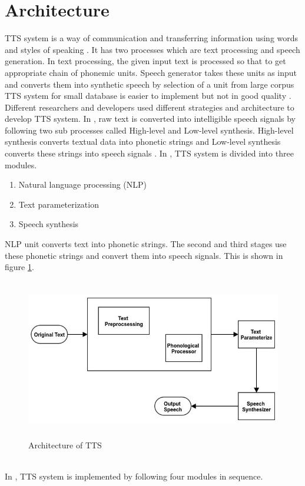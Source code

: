 \section{Architecture}
TTS system is a way of communication and transferring information using words and styles of speaking \cite{eide2004corpus}. It has two processes which are text processing and speech generation. In text processing, the given input text is processed so that to get appropriate chain of phonemic units. Speech generator takes these units as input and converts them into synthetic speech by selection of a unit from large corpus TTS system for small database is easier to implement but not in good quality \cite{black2007statistical, zen2007hmm, raj2007text}. Different researchers and developers used different strategies and architecture to develop TTS system. In \cite{kabir2002natural}, raw text is converted into intelligible speech signals by following two sub processes called High-level and Low-level synthesis. High-level synthesis converts textual data into phonetic strings and Low-level synthesis converts these strings into speech signals \cite{kabir2002natural}. In \cite{hussain2005phonological}, TTS system is divided into three modules.

\begin{enumerate}
  \item Natural language processing (NLP)
  \item Text parameterization
  \item Speech synthesis
\end{enumerate}

NLP unit converts text into phonetic strings. The second and third stages use these phonetic strings and convert them into speech signals. This is shown in figure \ref{fig:Architecture of TTS}.

\begin{figure}
  \centering
  \includegraphics[width=\linewidth, height=7cm,keepaspectratio]{images/tts_block_dg.jpg}
  \caption{Architecture of TTS}
  \label{fig:Architecture of TTS}
\end{figure}
\\
In \cite{liberman1992text}, TTS system is implemented by following four modules in sequence.

